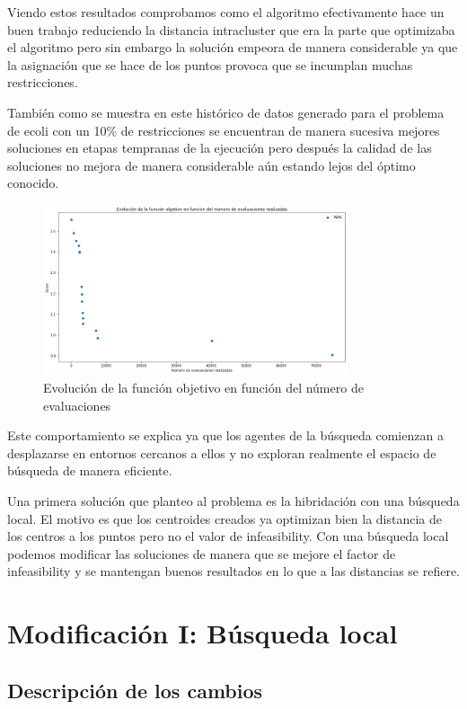 \documentclass[11pt]{article}
\begin{document}
Viendo estos resultados comprobamos como el algoritmo efectivamente hace un buen
trabajo reduciendo la distancia intracluster que era la parte que optimizaba el
algoritmo pero sin embargo la solución empeora de manera considerable ya que la
asignación que se hace de los puntos provoca que se incumplan muchas restricciones.

También como se muestra en este histórico de datos generado para el problema de
ecoli con un 10\% de restricciones se encuentran de manera sucesiva mejores
soluciones en etapas tempranas de la ejecución pero después la calidad de las
soluciones no mejora de manera considerable aún estando lejos del óptimo conocido. 

\begin{figure}[H]
  \centering
  \includegraphics[width=0.8\textwidth]{images/evolution}
  \caption{Evolución de la función objetivo en función del número de evaluaciones}
\end{figure}
  

Este comportamiento se explica ya que los agentes de la búsqueda comienzan a
desplazarse en entornos cercanos a ellos y no exploran realmente el espacio de
búsqueda de manera eficiente. 

Una primera solución que planteo al problema es la hibridación con una búsqueda
local. El motivo es que los centroides creados ya optimizan bien la distancia de
los centros a los puntos pero no el valor de infeasibility. Con una búsqueda
local podemos modificar las soluciones de manera que se mejore el factor de
infeasibility y se mantengan buenos resultados en lo que a las distancias se refiere.

\section{Modificación I: Búsqueda local}

\subsection{Descripción de los cambios}
\end{document}
